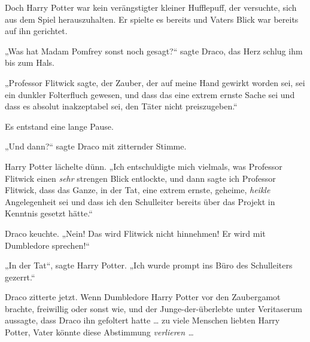 Doch Harry Potter war kein verängstigter kleiner Hufflepuff, der versuchte, sich aus dem Spiel herauszuhalten. Er spielte es bereits und Vaters Blick war bereits auf ihn gerichtet.

„Was hat Madam Pomfrey sonst noch gesagt?“ sagte Draco, das Herz schlug ihm bis zum Hals.

„Professor Flitwick sagte, der Zauber, der auf meine Hand gewirkt worden sei, sei ein dunkler Folterfluch gewesen, und dass das eine extrem ernste Sache sei und dass es absolut inakzeptabel sei, den Täter nicht preiszugeben.“

Es entstand eine lange Pause.

„Und dann?“ sagte Draco mit zitternder Stimme.

Harry Potter lächelte dünn.
„Ich entschuldigte mich vielmals, was Professor Flitwick einen \emph{sehr} strengen Blick entlockte, und dann sagte ich Professor Flitwick, dass das Ganze, in der Tat, eine extrem ernste, geheime, \emph{heikle} Angelegenheit sei und dass ich den Schulleiter bereits über das Projekt in Kenntnis gesetzt hätte.“

Draco keuchte.
„Nein! Das wird Flitwick nicht hinnehmen! Er wird mit Dumbledore sprechen!“

„In der Tat“, sagte Harry Potter.
„Ich wurde prompt ins Büro des Schulleiters gezerrt.“

Draco zitterte jetzt. Wenn Dumbledore Harry Potter vor den Zaubergamot brachte, freiwillig oder sonst wie, und der Junge-der-überlebte unter Veritaserum aussagte, dass Draco ihn gefoltert hatte … zu viele Menschen liebten Harry Potter, Vater könnte diese Abstimmung \emph{verlieren …}

